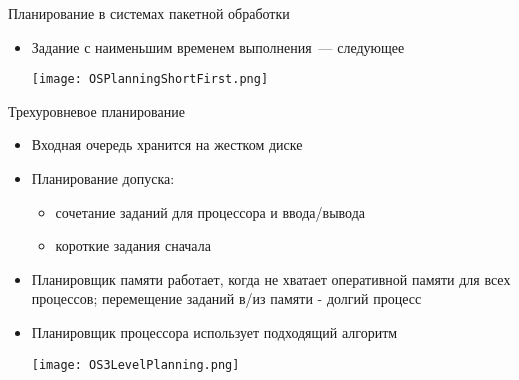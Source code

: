 \documentclass[aspectratio=169,14pt]{beamer}
\begin{document}
\begin{frame}{Планирование в системах пакетной обработки}
\begin{footnotesize}
\begin{spacing}{0.8}
\begin{itemize}
            \item Задание с наименьшим временем выполнения~--- следующее
            \begin{itemize}
                \begin{tiny}
                \end{tiny}
            \end{itemize}
            \texttt{[image: OSPlanningShortFirst.png]}

        \end{itemize}
    \end{spacing}
    \end{footnotesize}
\end{frame}

\begin{frame}{Трехуровневое планирование}
    \begin{itemize}
        \item Входная очередь хранится на жестком диске
        \item Планирование допуска:
        \begin{itemize}
            \item сочетание заданий для процессора и ввода/вывода
            \item короткие задания сначала
        \end{itemize}
        \item Планировщик памяти работает, когда не хватает оперативной памяти
        для всех процессов; перемещение заданий в/из памяти - долгий процесс
        \item Планировщик процессора использует подходящий алгоритм

        \texttt{[image: OS3LevelPlanning.png]}
    \end{itemize}
\end{frame}
\end{document}
